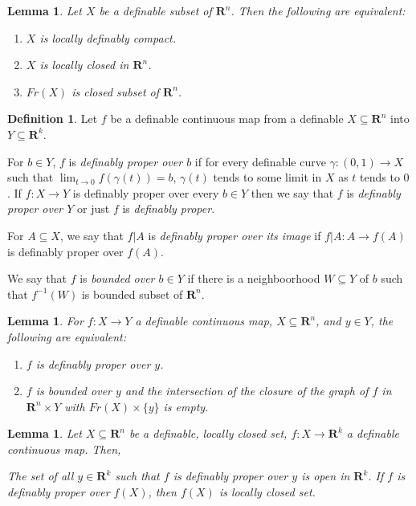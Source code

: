 \documentclass{amsart}
\newtheorem{lemma}[theorem]{Lemma}
\theoremstyle{definition}
\newtheorem{definition}[theorem]{Definition}
\numberwithin{equation}{section}
\begin{document}
\begin{lemma}
    Let $X$ be a definable subset of $\mathbf{R}^n$.
    Then the following are equivalent:
    \begin{enumerate}[label = {(\roman*)}]
        \item $X$ is locally definably compact.
        \item $X$ is locally closed in $\mathbf{R}^n$.
        \item $Fr(X)$ is closed subset of $\mathbf{R}^n$.
    \end{enumerate}
\end{lemma}

\begin{definition}
  Let $f$ be a definable continuous map from a definable $X \subseteq \mathbf{R}^n$ into $Y \subseteq \mathbf{R}^k$.

  For $b \in Y$, $f$ is \emph{definably proper over $b$} if for every definable curve $\gamma:(0,1) \to X$ such that $\lim_{t\to 0} f(\gamma(t)) = b$,
  $\gamma(t)$ tends to some limit in $X$ as $t$ tends to $0$.
  If $f: X \to Y$ is definably proper over every $b\in Y$ then
  we say that $f$ is \emph{definably proper over $Y$} or just 
  $f$ is \emph{definably proper}.

  For $A \subseteq X$, we say that $f|A$ is \emph{definably proper over its image} if $f|A : A \to f(A)$ is definably proper over $f(A)$.

  We say that $f$ is \emph{bounded over $b\in Y$} if there is a neighboorhood $W \subseteq Y$ of $b$ such that $f^{-1}(W)$ is bounded subset of $\mathbf{R}^n$. 
\end{definition}

\begin{lemma}
  For $f: X \to Y$ a definable continuous map,
  $X \subseteq \mathbf{R}^n$,
  and $y\in Y$, the following are equivalent:
  \begin{enumerate}[label = {(\roman*)}]
    \item $f$ is definably proper over $y$.
    \item $f$ is bounded over $y$ and the intersection of the closure of the graph of $f$ 
      in $\mathbf{R}^n\times Y$ with $Fr(X)\times \{y\}$ is empty.
  \end{enumerate}
\end{lemma}

\begin{lemma}
  Let $X \subseteq \mathbf{R}^n$ be a definable,
  locally closed set, $f: X \to \mathbf{R}^k$ a definable
  continuous map. Then,
  \begin{enumerate}[label = {(\roman*)}]
    The set of all $y \in \mathbf{R}^k$ such that $f$ is definably proper over $y$ is open in $\mathbf{R}^k$.
    If $f$ is definably proper over $f(X)$, then $f(X)$ is locally closed set.
  \end{enumerate}
\end{lemma}
\end{document}
